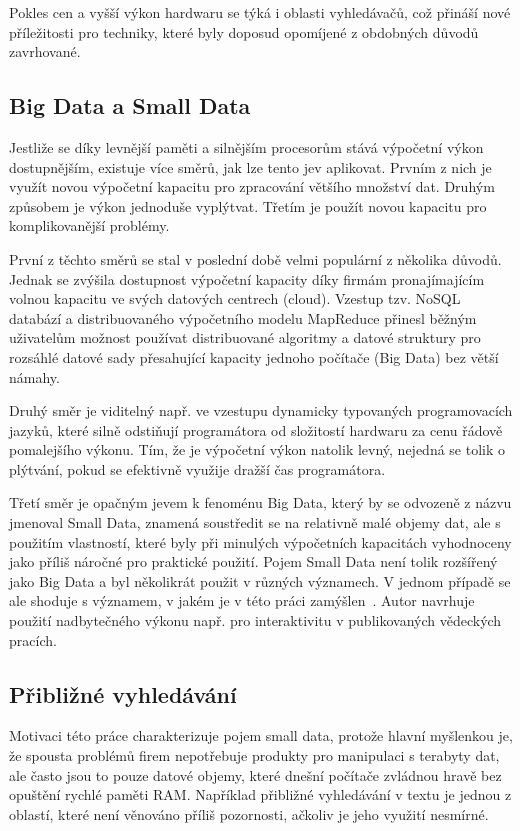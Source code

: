 \documentclass[11pt,letterpaper,oneside,openright]{book}
\begin{document}
Pokles cen a vyšší výkon hardwaru se týká i oblasti vyhledávačů, což přináší
nové příležitosti pro techniky, které byly doposud opomíjené z obdobných důvodů
zavrhované.

\subsection{Big Data a Small Data}
Jestliže se díky levnější paměti a silnějším procesorům stává výpočetní výkon
dostupnějším, existuje více směrů, jak lze tento jev aplikovat. Prvním z nich
je využít novou výpočetní kapacitu pro zpracování většího množství dat. Druhým
způsobem je výkon jednoduše vyplýtvat. Třetím je použít novou kapacitu pro
komplikovanější problémy.

První z těchto směrů se stal v poslední době velmi populární z několika důvodů.
Jednak se zvýšila dostupnost výpočetní kapacity díky firmám pronajímajícím
volnou kapacitu ve svých datových centrech (cloud). Vzestup tzv. NoSQL databází
a distribuovaného výpočetního modelu MapReduce přinesl běžným uživatelům
možnost používat distribuované algoritmy a datové struktury pro rozsáhlé datové
sady přesahující kapacity jednoho počítače (Big Data) bez větší námahy.

Druhý směr je viditelný např. ve vzestupu dynamicky typovaných programovacích
jazyků, které silně odstiňují programátora od složitostí hardwaru za cenu
řádově pomalejšího výkonu. Tím, že je výpočetní výkon natolik levný, nejedná se
tolik o plýtvání, pokud se efektivně využije dražší čas programátora.

Třetí směr je opačným jevem k fenoménu Big Data, který by se odvozeně z názvu
jmenoval Small Data, znamená soustředit se na relativně malé objemy dat, ale s
použitím vlastností, které byly při minulých výpočetních kapacitách vyhodnoceny
jako příliš náročné pro praktické použití. Pojem Small Data není tolik
rozšířený jako Big Data a byl několikrát použit v různých významech. V jednom
případě se ale shoduje s významem, v jakém je v této práci
zamýšlen~\cite{small_data}. Autor navrhuje použití nadbytečného výkonu např.
pro interaktivitu v publikovaných vědeckých pracích.

\subsection{Přibližné vyhledávání}
Motivaci této práce charakterizuje pojem small data, protože hlavní myšlenkou
je, že spousta problémů firem nepotřebuje produkty pro manipulaci s terabyty
dat, ale často jsou to pouze datové objemy, které dnešní počítače zvládnou
hravě bez opuštění rychlé paměti RAM. Například přibližné vyhledávání v
textu je jednou z oblastí, které není věnováno příliš pozornosti, ačkoliv je
jeho využití nesmírné.
\end{document}
